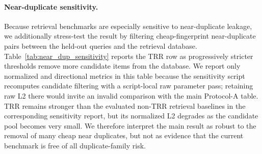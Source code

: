 \paragraph{Near-duplicate sensitivity.}
Because retrieval benchmarks are especially sensitive to near-duplicate leakage, we additionally stress-test the result by filtering cheap-fingerprint near-duplicate pairs between the held-out queries and the retrieval database. Table~\ref{tab:near_dup_sensitivity} reports the TRR row as progressively stricter thresholds remove more candidate items from the database. We report only normalized and directional metrics in this table because the sensitivity script recomputes candidate filtering with a script-local raw parameter pass; retaining raw L2 there would invite an invalid comparison with the main Protocol-A table. TRR remains stronger than the evaluated non-TRR retrieval baselines in the corresponding sensitivity report, but its normalized L2 degrades as the candidate pool becomes very small. We therefore interpret the main result as robust to the removal of many cheap near duplicates, but not as evidence that the current benchmark is free of all duplicate-family risk.

\begin{table}[t]
\centering
\caption{Near-duplicate sensitivity for TRR on the audited Protocol-A split. The threshold controls cheap-fingerprint filtering between held-out queries and the retrieval database. Lower Norm.L2 is better.}
\label{tab:near_dup_sensitivity}
\small
\setlength{\tabcolsep}{4pt}
\end{table}

